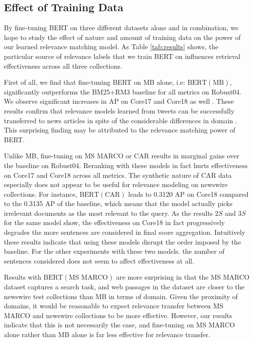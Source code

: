 \subsection{Effect of Training Data}

By fine-tuning BERT on three different datasets alone and in combination, we hope to study the effect of nature and amount of training data on the power of our learned relevance matching model.
As Table \ref{tab:results} shows, the particular source of relevance labels that we train BERT on  influences retrieval effectiveness across all three collections.

First of all, we find that fine-tuning BERT on MB alone, i.e: $ \textrm{BERT}(\textrm{MB}) $, significantly outperforms the BM25+RM3 baseline for all metrics on Robust04.
We observe significant increases in AP on Core17 and Core18 as well .
These results confirm that relevance models learned from tweets can be successfully transferred to news articles in spite of the considerable differences in domain .
This surprising finding may be attributed to the relevance matching power of BERT.

Unlike MB, fine-tuning on MS MARCO or CAR results in marginal gains over the baseline on Robust04.
Reranking with these models in fact hurts effectiveness on Core17 and Core18 across all metrics.
The synthetic nature of CAR data especially does not appear to be useful for relevance modeling on newswire collections.
For instance, $ \textrm{BERT}(\textrm{CAR}) $ leads to 0.3120 AP on Core18 compared to the 0.3135 AP of the baseline, which means that the model actually picks irrelevant documents as the most relevant to the query.
As the results $ 2S $ and $ 3S $ for the same model show, the effectiveness on Core18 in fact progressively degrades the more sentences are considered in final score aggregation.
Intuitively these results indicate that using these models disrupt the order imposed by the baseline.
For the other experiments with these two models. the number of sentences considered does not seem to affect effectiveness at all.

Results with $ \textrm{BERT}(\textrm{MS MARCO}) $ are more surprising in that the MS MARCO dataset captures a search task, and web passages in the dataset are closer to the newswire test collections than MB in terms of domain.
Given the proximity of domains, it would be reasonable to expect relevance transfer between MS MARCO and newswire collections to be more effective.
However, our results indicate that this is not necessarily the case, and fine-tuning on MS MARCO alone rather than MB alone is far less effective for relevance transfer.

